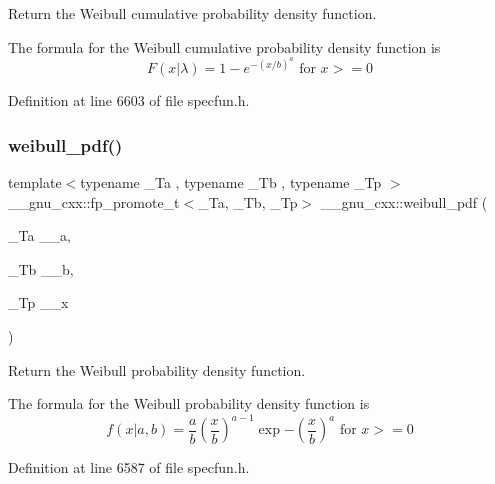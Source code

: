 Return the Weibull cumulative probability density function. 

The formula for the Weibull cumulative probability density function is \[ F(x|\lambda) = 1 - e^{-(x / b)^a} \mbox{ for } x >= 0 \] 

Definition at line 6603 of file specfun.\+h.

\mbox{\label{group__gnu__math__spec__func_gacfbb6ca9df8e0aa092ff4406baff597c}} 
\subsubsection{\texorpdfstring{weibull\+\_\+pdf()}{weibull\_pdf()}}
{\footnotesize\ttfamily template$<$typename \+\_\+\+Ta , typename \+\_\+\+Tb , typename \+\_\+\+Tp $>$ \\
\+\_\+\+\_\+gnu\+\_\+cxx\+::fp\+\_\+promote\+\_\+t$<$\+\_\+\+Ta, \+\_\+\+Tb, \+\_\+\+Tp$>$ \+\_\+\+\_\+gnu\+\_\+cxx\+::weibull\+\_\+pdf (\begin{DoxyParamCaption}\item[{\+\_\+\+Ta}]{\+\_\+\+\_\+a,  }\item[{\+\_\+\+Tb}]{\+\_\+\+\_\+b,  }\item[{\+\_\+\+Tp}]{\+\_\+\+\_\+x }\end{DoxyParamCaption})\hspace{0.3cm}{\ttfamily [inline]}}



Return the Weibull probability density function. 

The formula for the Weibull probability density function is \[ f(x | a, b) = \frac{a}{b} \left(\frac{x}{b} \right)^{a-1} \exp{-\left(\frac{x}{b}\right)^a} \mbox{ for } x >= 0 \] 

Definition at line 6587 of file specfun.\+h.

\mbox{\label{group__gnu__math__spec__func_gaaed33f29c1eb1d2c5b9590fe2e57151c}} 

